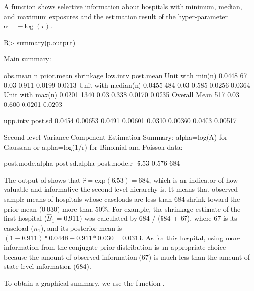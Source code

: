 \documentclass[article]{jss}
\begin{document}
A function  shows selective information about hospitals with minimum, median, and maximum exposures and the estimation result of the hyper-parameter $\alpha=-\log(r)$.  \begin{CodeChunk}
\begin{CodeInput}
R> summary(p.output)
\end{CodeInput}
\begin{CodeOutput}
Main summary:

                    obs.mean    n prior.mean shrinkage low.intv post.mean
Unit with min(n)      0.0448   67       0.03     0.911   0.0199    0.0313   
Unit with median(n)   0.0455  484       0.03     0.585   0.0256    0.0364   
Unit with max(n)      0.0201 1340       0.03     0.338   0.0170    0.0235   
Overall Mean                  517       0.03     0.600   0.0201    0.0293   

                    upp.intv  post.sd
                      0.0454  0.00653
                      0.0491  0.00601
                      0.0310  0.00360
                      0.0403  0.00517

Second-level Variance Component Estimation Summary:
alpha=log(A) for Gaussian or alpha=log(1/r) for Binomial and Poisson data:

post.mode.alpha post.sd.alpha post.mode.r
          -6.53         0.576         684
\end{CodeOutput}
\end{CodeChunk}
The output of  shows that $\hat{r}=\textrm{exp}(6.53)=684$, which is an indicator of how valuable and informative the second-level hierarchy is. It means that observed sample means of hospitals whose caseloads are less than 684 shrink toward the prior mean (0.030) more than 50\%. For example, the shrinkage estimate of the first hospital ($\hat{B}_{1}= 0.911$) was calculated by 684 / (684 + 67), where 67 is its caseload ($n_{1}$), and its posterior mean is $(1-0.911)*0.0448 + 0.911 * 0.030=0.0313$. As for this hospital, using more information from the conjugate prior distribution is an appropriate choice because the amount  of observed information (67) is much less than the amount of state-level information (684).


To obtain a graphical summary, we use the function .%
\end{document}
